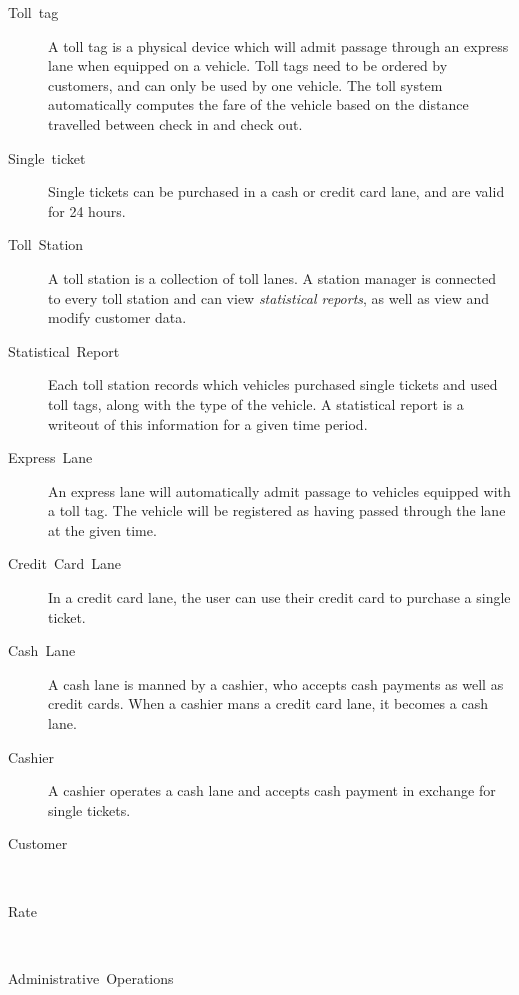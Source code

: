 \begin{description}
\item [{Toll~tag}] A toll tag is a physical device which will admit passage
through an express lane when equipped on a vehicle. Toll tags need
to be ordered by customers, and can only be used by one vehicle. The
toll system automatically computes the fare of the vehicle based on
the distance travelled between check in and check out.

\item [{Single~ticket}] Single tickets can be purchased in a cash or credit
card lane, and are valid for 24 hours.

\item [{Toll~Station}] A toll station is a collection of toll lanes. A
station manager is connected to every toll station and can view \emph{statistical
reports}, as well as view and modify customer data.

\item [{Statistical~Report}] Each toll station records which vehicles
purchased single tickets and used toll tags, along with the type of
the vehicle. A statistical report is a writeout of this information
for a given time period.

\item [{Express~Lane}] An express lane will automatically admit passage
to vehicles equipped with a toll tag. The vehicle will be registered
as having passed through the lane at the given time.

\item [{Credit~Card~Lane}] In a credit card lane, the user can use their
credit card to purchase a single ticket.

\item [{Cash~Lane}] A cash lane is manned by a cashier, who accepts cash
payments as well as credit cards. When a cashier mans a credit card
lane, it becomes a cash lane.

\item [{Cashier}] A cashier operates a cash lane and accepts cash payment
in exchange for single tickets.

\item [{Customer}]~

\item [{Rate}]~

\item [{Administrative~Operations}]~
\end{description}
